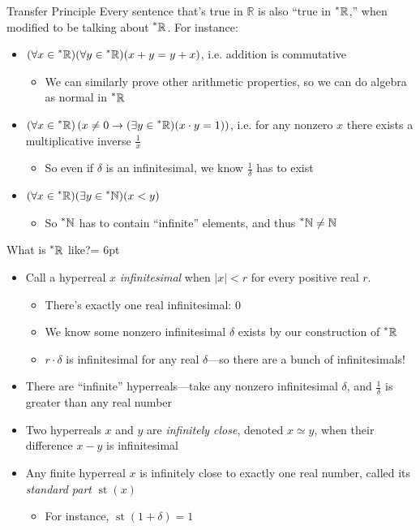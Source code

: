 \documentclass{beamer}
\theoremstyle{plain}
\theoremstyle{definition}
\newcommand{\stp}[1]{\st\left(#1\right)}
\newcommand{\reals}{\mathbb{R}}
\newcommand{\hreals}{\prescript{*}{}{\mathbb{R}}}
\newcommand{\nats}{\mathbb{N}}
\newcommand{\hnats}{\prescript{*}{}{\mathbb{N}}}
\DeclareMathOperator{\st}{st}
\begin{document}
\begin{frame}{Transfer Principle}
Every sentence that's true in $\reals$ is also ``true in $\hreals$,'' when modified to be talking about $\hreals$. For instance: \vspace{4pt}
\begin{itemize} \itemsep = 6pt
	\item $(\forall x \in \hreals)(\forall y \in \hreals)(x + y = y + x)$, i.e. addition is commutative
	\begin{itemize}
		\item We can similarly prove other arithmetic properties, so we can do algebra as normal in $\hreals$
	\end{itemize}
	\item $(\forall x \in \hreals)\left(x \neq 0 \to (\exists y \in \hreals)(x \cdot y = 1)\right)$, i.e. for any nonzero $x$ there exists a multiplicative inverse $\frac{1}{x}$
	\begin{itemize}
		\item So even if $\delta$ is an infinitesimal, we know $\frac{1}{\delta}$ has to exist
	\end{itemize}
	\item $(\forall x \in \hreals)(\exists y \in \hnats)(x < y)$
	\begin{itemize}
		\item So $\hnats$ has to contain ``infinite'' elements, and thus $\hnats \neq \nats$
	\end{itemize}
\end{itemize}
\end{frame}

\begin{frame}{What is $\hreals$ like?}\itemsep = 6pt
\begin{itemize}
\item Call a hyperreal $x$ \textit{infinitesimal} when $|x| < r$ for every positive real $r$. 
	\begin{itemize}
	\item There's exactly one real infinitesimal: $0$
	\item We know some nonzero infinitesimal $\delta$ exists by our construction of $\hreals$
	\item $r \cdot \delta$ is infinitesimal for any real $\delta$---so there are a bunch of infinitesimals!
	\end{itemize}
\item There are ``infinite'' hyperreals---take any nonzero infinitesimal $\delta$, and $\frac{1}{\delta}$ is greater than any real number
\item Two hyperreals $x$ and $y$ are \textit{infinitely close}, denoted $x \simeq y$, when their difference $x - y$ is infinitesimal
\item Any finite hyperreal $x$ is infinitely close to exactly one real number, called its \textit{standard part} $\stp{x}$
	\begin{itemize}
	\item For instance, $\stp{1 + \delta} = 1$
	\end{itemize}
\end{itemize}
\end{frame}
\end{document}
